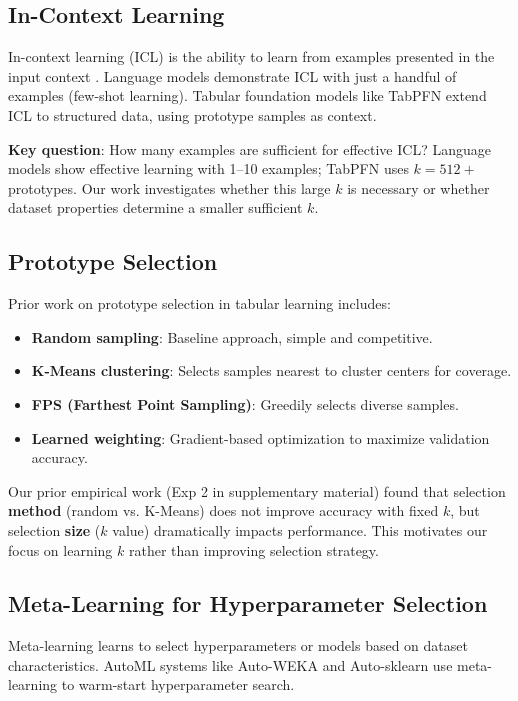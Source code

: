 \documentclass[11pt,a4paper]{article}
\begin{document}
\subsection{In-Context Learning}

In-context learning (ICL) is the ability to learn from examples presented in the input context \cite{brown2020language}. Language models demonstrate ICL with just a handful of examples (few-shot learning). Tabular foundation models like TabPFN extend ICL to structured data, using prototype samples as context.

\textbf{Key question}: How many examples are sufficient for effective ICL? Language models show effective learning with 1--10 examples; TabPFN uses $k=512+$ prototypes. Our work investigates whether this large $k$ is necessary or whether dataset properties determine a smaller sufficient $k$.

\subsection{Prototype Selection}

Prior work on prototype selection in tabular learning includes:
\begin{itemize}
\item \textbf{Random sampling}: Baseline approach, simple and competitive.
\item \textbf{K-Means clustering}: Selects samples nearest to cluster centers for coverage.
\item \textbf{FPS (Farthest Point Sampling)}: Greedily selects diverse samples.
\item \textbf{Learned weighting}: Gradient-based optimization to maximize validation accuracy.
\end{itemize}

Our prior empirical work (Exp 2 in supplementary material) found that selection \textbf{method} (random vs. K-Means) does not improve accuracy with fixed $k$, but selection \textbf{size} ($k$ value) dramatically impacts performance. This motivates our focus on learning $k$ rather than improving selection strategy.

\subsection{Meta-Learning for Hyperparameter Selection}

Meta-learning \cite{vanschoren2019meta} learns to select hyperparameters or models based on dataset characteristics. AutoML systems like Auto-WEKA and Auto-sklearn use meta-learning to warm-start hyperparameter search.
\end{document}
